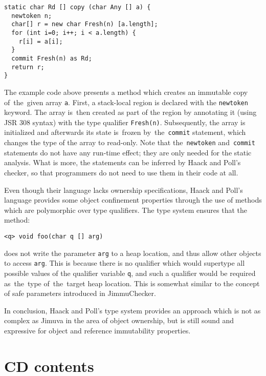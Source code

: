\documentclass{pracamgr}
\theoremstyle{break}
\theoremstyle{break}
\theoremstyle{break}
\begin{document}
\begin{lstlisting}[morekeywords={commit,newtoken,char}]
static char Rd [] copy (char Any [] a) {
  newtoken n;
  char[] r = new char Fresh(n) [a.length];
  for (int i=0; i++; i < a.length) { 
    r[i] = a[i];
  }
  commit Fresh(n) as Rd;
  return r;
}
\end{lstlisting}

The example code above presents a method which creates an immutable
copy of~the~given array \texttt{a}. First, a stack-local region is
declared with the \texttt{newtoken} keyword. The array is~then created
as part of the region by annotating it (using JSR 308 syntax) with the
type qualifier \texttt{Fresh(n)}. Subsequently, the array is
initialized and afterwards its state is~frozen by~the~\texttt{commit}
statement, which changes the type of the array to read-only. Note that
the~\texttt{newtoken} and~\texttt{commit} statements do not have any
run-time effect; they are only needed for the static analysis. What is
more, the statements can be inferred by Haack and Poll's checker, so
that programmers do not need to use them in their code at all.

Even though their language lacks ownership specifications, Haack and
Poll's language provides some object confinement properties through
the use of methods which are polymorphic over type qualifiers. The
type system ensures that the method:
\begin{center}
  \texttt{<q> void foo(char q [] arg)}
\end{center}
does not write the parameter \texttt{arg} to a heap location, and thus
allow other objects to access \texttt{arg}. This is because there is
no qualifier which would supertype all possible values of the
qualifier variable \texttt{q}, and such a qualifier would be required
as~the~type of~the~target heap location. This is somewhat similar to
the concept of safe parameters introduced in JimmuChecker.

In conclusion, Haack and Poll's type system provides an approach which
is not as complex as Jimuva in the area of object ownership, but is
still sound and expressive for object and reference immutability
properties.

\appendix


\chapter{CD contents}
\label{chap:cd}
\end{document}
